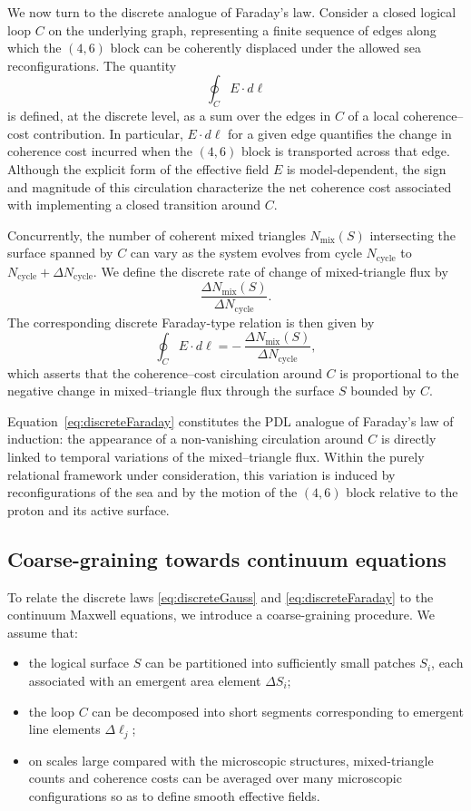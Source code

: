\documentclass[11pt,a4paper]{article}
\begin{document}
We now turn to the discrete analogue of Faraday’s law.
Consider a closed logical loop $C$ on the underlying graph, representing a finite sequence of edges along which the $(4,6)$ block can be coherently displaced under the allowed sea reconfigurations.
The quantity
\[
\oint_{C} E\cdot d\ell
\]
is defined, at the discrete level, as a sum over the edges in $C$ of a local coherence–cost contribution. In particular, $E\cdot d\ell$ for a given edge quantifies the change in coherence cost incurred when the $(4,6)$ block is transported across that edge.\cite{Laubscher2026SchrodingerSketch}
Although the explicit form of the effective field $E$ is model-dependent, the sign and magnitude of this circulation characterize the net coherence cost associated with implementing a closed transition around $C$.

Concurrently, the number of coherent mixed triangles $N_{\mathrm{mix}}(S)$ intersecting the surface spanned by $C$ can vary as the system evolves from cycle $N_{\mathrm{cycle}}$ to $N_{\mathrm{cycle}} + \Delta N_{\mathrm{cycle}}$.
We define the discrete rate of change of mixed-triangle flux by
\[
\frac{\Delta N_{\mathrm{mix}}(S)}{\Delta N_{\mathrm{cycle}}}.
\]
The corresponding discrete Faraday-type relation is then given by
\begin{equation}
\oint_{C} E\cdot d\ell = -\,\frac{\Delta N_{\mathrm{mix}}(S)}{\Delta N_{\mathrm{cycle}}},
\label{eq:discreteFaraday}
\end{equation}
which asserts that the coherence–cost circulation around $C$ is proportional to the negative change in mixed–triangle flux through the surface $S$ bounded by $C$.\cite{Laubscher2026SchrodingerSketch}

Equation~\eqref{eq:discreteFaraday} constitutes the PDL analogue of Faraday’s law of induction: the appearance of a non-vanishing circulation around $C$ is directly linked to temporal variations of the mixed–triangle flux.
Within the purely relational framework under consideration, this variation is induced by reconfigurations of the sea and by the motion of the $(4,6)$ block relative to the proton and its active surface.

\subsection{Coarse-graining towards continuum equations}

To relate the discrete laws \eqref{eq:discreteGauss} and \eqref{eq:discreteFaraday} to the continuum Maxwell equations, we introduce a coarse-graining procedure. We assume that:
\begin{itemize}
  \item the logical surface $S$ can be partitioned into sufficiently small patches $S_{i}$, each associated with an emergent area element $\Delta S_{i}$;
  \item the loop $C$ can be decomposed into short segments corresponding to emergent line elements $\Delta \ell_{j}$;
  \item on scales large compared with the microscopic structures, mixed-triangle counts and coherence costs can be averaged over many microscopic configurations so as to define smooth effective fields.
\end{itemize}
\end{document}
